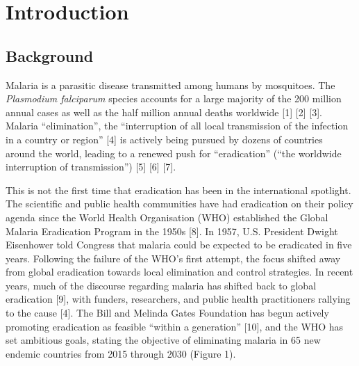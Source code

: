 \documentclass[]{article}
\begin{document}
\noindent{}

\section{Introduction}\label{introduction}

\subsection{Background}\label{background}

Malaria is a parasitic disease transmitted among humans by mosquitoes.
The \emph{Plasmodium falciparum} species accounts for a large majority
of the 200 million annual cases as well as the half million annual
deaths worldwide {[}1{]} {[}2{]} {[}3{]}. Malaria ``elimination'', the
``interruption of all local transmission of the infection in a country
or region'' {[}4{]} is actively being pursued by dozens of countries
around the world, leading to a renewed push for ``eradication'' (``the
worldwide interruption of transmission'') {[}5{]} {[}6{]} {[}7{]}.

This is not the first time that eradication has been in the
international spotlight. The scientific and public health communities
have had eradication on their policy agenda since the World Health
Organisation (WHO) established the Global Malaria Eradication Program in
the 1950s {[}8{]}. In 1957, U.S. President Dwight Eisenhower told
Congress that malaria could be expected to be eradicated in five years.
Following the failure of the WHO's first attempt, the focus shifted away
from global eradication towards local elimination and control
strategies. In recent years, much of the discourse regarding malaria has
shifted back to global eradication {[}9{]}, with funders, researchers,
and public health practitioners rallying to the cause {[}4{]}. The Bill
and Melinda Gates Foundation has begun actively promoting eradication as
feasible ``within a generation'' {[}10{]}, and the WHO has set ambitious
goals, stating the objective of eliminating malaria in 65 new endemic
countries from 2015 through 2030 (Figure 1).
\end{document}
